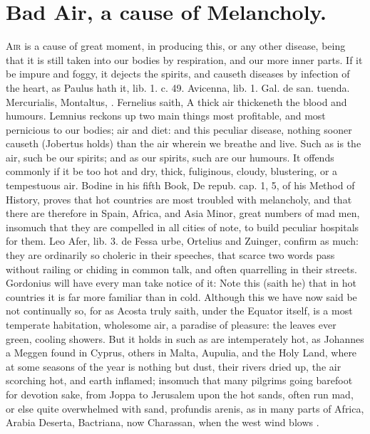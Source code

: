 {{%
\section{Bad Air, a cause of Melancholy.}

\lettrine{A}{ir} is a cause of great moment, in producing this, or any other
disease, being that it is still taken into our bodies by respiration,
and our more inner parts. If it be impure and foggy, it dejects
the spirits, and causeth diseases by infection of the heart, as Paulus
hath it, lib. 1. c. 49. Avicenna, lib. 1. Gal. de san. tuenda.
Mercurialis, Montaltus, \etc{}. Fernelius saith, A thick air
thickeneth the blood and humours. Lemnius reckons up two main
things most profitable, and most pernicious to our bodies; air and
diet: and this peculiar disease, nothing sooner causeth (Jobertus
holds) than the air wherein we breathe and live. Such as is the
air, such be our spirits; and as our spirits, such are our humours. It
offends commonly if it be too hot and dry, thick, fuliginous,
cloudy, blustering, or a tempestuous air. Bodine in his fifth Book, De
repub. cap. 1, 5, of his Method of History, proves that hot countries
are most troubled with melancholy, and that there are therefore in
Spain, Africa, and Asia Minor, great numbers of mad men, insomuch that
they are compelled in all cities of note, to build peculiar hospitals
for them. Leo Afer, lib. 3. de Fessa urbe, Ortelius and Zuinger,
confirm as much: they are ordinarily so choleric in their speeches,
that scarce two words pass without railing or chiding in common talk,
and often quarrelling in their streets. Gordonius will have every
man take notice of it: Note this (saith he) that in hot countries it is
far more familiar than in cold. Although this we have now said be not
continually so, for as Acosta truly saith, under the Equator
itself, is a most temperate habitation, wholesome air, a paradise of
pleasure: the leaves ever green, cooling showers. But it holds in such
as are intemperately hot, as Johannes a Meggen found in Cyprus,
others in Malta, Aupulia, and the Holy Land, where at some
seasons of the year is nothing but dust, their rivers dried up, the air
scorching hot, and earth inflamed; insomuch that many pilgrims going
barefoot for devotion sake, from Joppa to Jerusalem upon the hot sands,
often run mad, or else quite overwhelmed with sand, profundis arenis,
as in many parts of Africa, Arabia Deserta, Bactriana, now Charassan,
when the west wind blows .

}}
